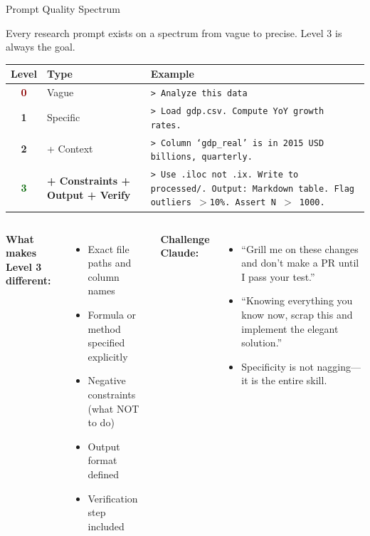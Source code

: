 \documentclass[aspectratio=169,10pt]{beamer}
\newcommand{\emphc}[1]{\textcolor{harvardcrimson}{#1}}
\newcommand{\boristip}[1]{%
  \tikz[baseline=(X.base)]{\node[fill=level4,text=white,
  rounded corners=2pt,inner sep=2pt,font=\tiny\bfseries](X){TIP #1};}}
\begin{document}
\begin{frame}[fragile,shrink=8]{Prompt Quality Spectrum}
\small

Every research prompt exists on a spectrum from vague to precise. \emphc{Level 3 is always the goal.}

\vspace{0.3em}
\small
\renewcommand{\arraystretch}{1.3}
\begin{tabular}{c p{3cm} p{7.5cm}}
\toprule
\textbf{Level} & \textbf{Type} & \textbf{Example} \\
\midrule
\textcolor{darkred}{\textbf{0}} & Vague & \texttt{> Analyze this data} \\
\textbf{1} & Specific & \texttt{> Load gdp.csv. Compute YoY growth rates.} \\
\textbf{2} & + Context & \texttt{> Column `gdp\_real' is in 2015 USD billions, quarterly.} \\
\rowcolor{softgreen!10}
\textcolor{darkgreen}{\textbf{3}} & \textbf{+ Constraints + Output + Verify} & \texttt{> Use .iloc not .ix. Write to processed/. Output: Markdown table. Flag outliers $>$10\%. Assert N $>$ 1000.} \\
\bottomrule
\end{tabular}

\vspace{0.3em}
\begin{columns}[T]
\textbf{What makes Level 3 different:}
\begin{itemize}\itemsep0pt
    \item Exact file paths and column names
    \item Formula or method specified explicitly
    \item Negative constraints (what NOT to do)
    \item Output format defined
    \item Verification step included
\end{itemize}

\boristip{6} \textbf{Challenge Claude:}
\begin{itemize}\itemsep0pt
    \item ``Grill me on these changes and don't make a PR until I pass your test.''
    \item ``Knowing everything you know now, scrap this and implement the elegant solution.''
    \item Specificity is not nagging---it is the entire skill.
\end{itemize}
\end{columns}
\end{frame}
\end{document}
